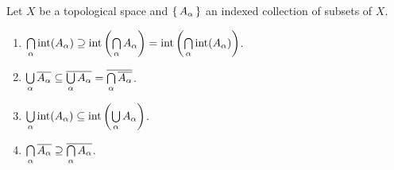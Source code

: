\documentclass[letterpaper, 11pt, oneside]{book}
\begin{document}
\begin{prop}
  Let $X$ be a topological space and $\set{A_{\alpha}}$ an indexed collection of subsets of $X$.
  \begin{enumerate}
  \item $\Bigcap_{\alpha} \inte(A_{\alpha}) \containseq \inte\pqty{\Bigcap_{\alpha} A_{\alpha}} = \inte\pqty{\Bigcap_{\alpha} \inte(A_{\alpha})}$.
  \item $\bigcup\limits_{\alpha} \overline{A_{\alpha}} \subseteq \overline{\bigcup\limits_{\alpha} A_{\alpha}} = \overline{\bigcap\limits_{\alpha} \overline{A_{\alpha}}}$.
  \item $\Bigcup_{\alpha} \inte(A_{\alpha}) \subseteq \inte\pqty{\Bigcup_{\alpha} A_{\alpha}}$.
  \item $\bigcap\limits_{\alpha} \overline{A_{\alpha}} \supseteq \overline{\bigcap\limits_{\alpha} A_{\alpha}}$.
  \end{enumerate}
\end{prop}
\end{document}

